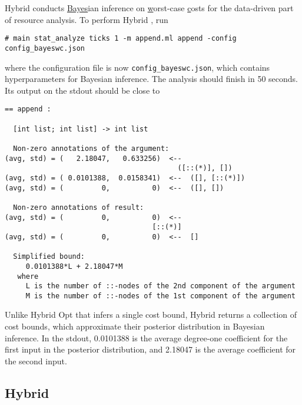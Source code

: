 Hybrid \BayesWC{} conducts \underline{Bayes}ian inference on
\underline{w}orst-case \underline{c}osts for the data-driven part of resource
analysis.
%
To perform Hybrid \BayesWC{}, run
\begin{verbatim}
# main stat_analyze ticks 1 -m append.ml append -config config_bayeswc.json
\end{verbatim}
where the configuration file is now \texttt{config\_bayeswc.json}, which
contains hyperparameters for Bayesian inference.
%
The analysis should finish in 50 seconds.
%
Its output on the stdout should be close to
\begin{verbatim}
== append :

  [int list; int list] -> int list

  Non-zero annotations of the argument:
(avg, std) = (   2.18047,   0.633256)  <--
                                         ([::(*)], [])
(avg, std) = ( 0.0101388,  0.0158341)  <--  ([], [::(*)])
(avg, std) = (         0,          0)  <--  ([], [])

  Non-zero annotations of result:
(avg, std) = (         0,          0)  <--
                                   [::(*)]
(avg, std) = (         0,          0)  <--  []

  Simplified bound:
     0.0101388*L + 2.18047*M
   where
     L is the number of ::-nodes of the 2nd component of the argument
     M is the number of ::-nodes of the 1st component of the argument
\end{verbatim}
%
Unlike Hybrid Opt{} that infers a single cost bound, Hybrid \BayesWC{} returns a
collection of cost bounds, which approximate their posterior distribution in
Bayesian inference.
%
In the stdout, 0.0101388 is the average degree-one coefficient for the first
input in the posterior distribution, and 2.18047 is the average
coefficient for the second input.

\subsection{Hybrid \BayesPC{}}

